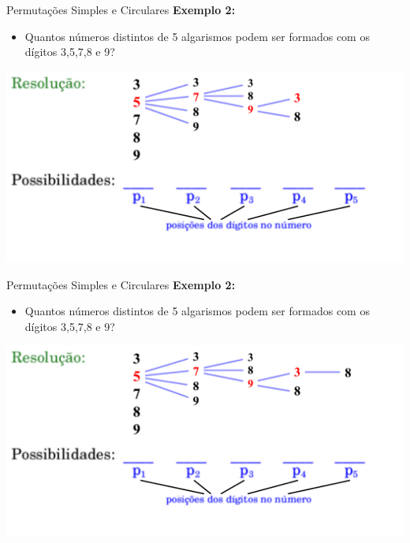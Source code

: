 \documentclass[aspectratio=169]{beamer}
\begin{document}
\begin{frame}{Permutações Simples e Circulares}
    \textbf{Exemplo 2:}

    \vspace{3mm}

    \begin{itemize}
        \item[] Quantos números distintos de 5 algarismos podem ser formados com os dígitos 3,5,7,8 e 9?
    \end{itemize}

    \begin{center}
        \includegraphics[width=0.75\linewidth]{figs/Exemplo2_8.png}
    \end{center}
\end{frame}

\begin{frame}{Permutações Simples e Circulares}
    \textbf{Exemplo 2:}

    \vspace{3mm}

    \begin{itemize}
        \item[] Quantos números distintos de 5 algarismos podem ser formados com os dígitos 3,5,7,8 e 9?
    \end{itemize}

    \begin{center}
        \includegraphics[width=0.75\linewidth]{figs/Exemplo2_9.png}
    \end{center}
\end{frame}
\end{document}
